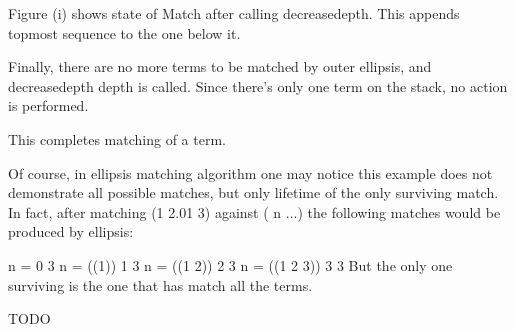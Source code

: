 Figure (i) shows state of Match after calling decreasedepth. This appends topmost sequence to the one below it.

Finally, there are no more terms to be matched by outer ellipsis, and decreasedepth depth is called. Since there's only one term on the stack, no action is performed.

This completes matching of a term. 

Of course, in ellipsis matching algorithm one may notice this example does not demonstrate all possible matches, but only lifetime of the only surviving match. In fact, after matching (1 2.01 3) against ( n ...) the following matches would be produced by ellipsis:

n =         0 3
n = ((1))   1 3
n = ((1 2)) 2 3
n = ((1 2 3)) 3 3
But the only one surviving is the one that has match all the terms. 

TODO 
